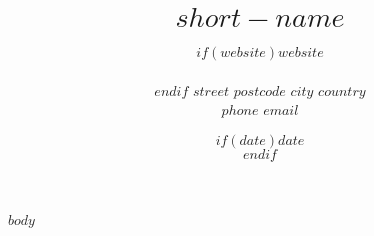 \documentclass[11pt, a4paper]{article}
\title{$short-name$} %
\date{$if(date)$$date$\\$endif$} %
\author{$if(website)$$website$\\\\$endif$
$street$ \textbar{} $postcode$ $city$ \textbar{} $country$\\ %
$phone$ \textbar{} $email$ } %
\begin{document}
\maketitle
\begin{raggedright}
$body$
\end{raggedright}
\end{document}

